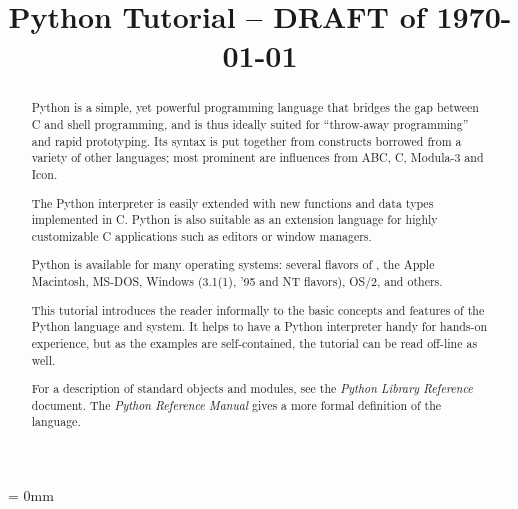 
%

\title{Python Tutorial -- DRAFT of \today}






\maketitle



\begin{abstract}

\noindent
Python is a simple, yet powerful programming language that bridges the
gap between C and shell programming, and is thus ideally suited for
``throw-away programming'' and rapid prototyping.  Its syntax is put
together from constructs borrowed from a variety of other languages;
most prominent are influences from ABC, C, Modula-3 and Icon.

The Python interpreter is easily extended with new functions and data
types implemented in C.  Python is also suitable as an extension
language for highly customizable C applications such as editors or
window managers.

Python is available for many operating systems:
several flavors of \UNIX{}, the Apple Macintosh, MS-DOS, Windows
(3.1(1), '95 and NT flavors), OS/2, and others.

This tutorial introduces the reader informally to the basic concepts
and features of the Python language and system.  It helps to have a
Python interpreter handy for hands-on experience, but as the examples
are self-contained, the tutorial can be read off-line as well.

For a description of standard objects and modules, see the \emph{Python
Library Reference} document.  The \emph{Python Reference Manual} gives
a more formal definition of the language.

\end{abstract}

\pagebreak
{
\parskip = 0mm
\tableofcontents
}

\pagebreak



